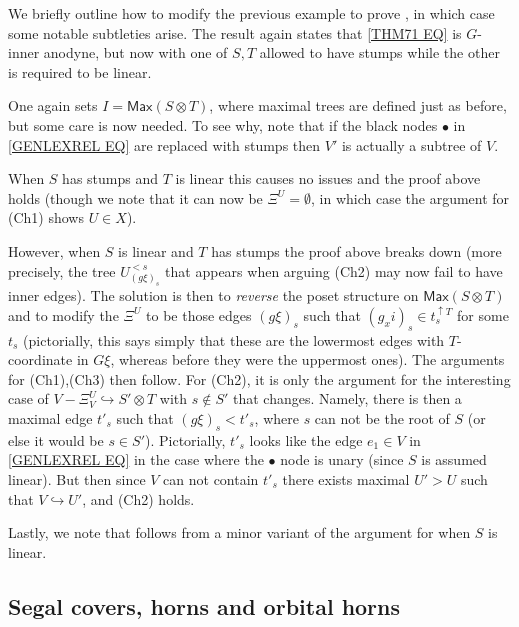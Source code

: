 \documentclass[a4paper,10pt,draft]{article}%
\begin{document}
 
\begin{remark}
We briefly outline how to modify the previous example to prove 
\cite[Thm 7.1(ii)]{Per17}, in which case some notable subtleties arise.
The result again states that \eqref{THM71 EQ} is $G$-inner anodyne, but now with one of $S,T$ allowed to have stumps while the other is required to be linear.

One again sets $I=\mathsf{Max}(S\otimes T)$, where maximal trees are defined just as before, but some care is now needed.
To see why, note that if the black nodes $\bullet$ in \eqref{GENLEXREL EQ} are replaced with stumps then $V'$
is actually a subtree of $V$.

When $S$ has stumps and $T$ is linear this causes no issues and the proof above holds
(though we note that it can now be 
$\Xi^U=\emptyset$, in which case the argument for (Ch1) shows $U\in X$).

However, when $S$ is linear and $T$ has stumps the proof above breaks down (more precisely, the tree $U_{(g\xi)_s}^{<s}$ that appears when arguing (Ch2) may now fail to have inner edges). The solution is then to \textit{reverse} the poset structure on 
$\mathsf{Max}(S\otimes T)$
and to modify the $\Xi^U$ to be those edges $(g \xi)_s$ such that
$(g _xi)_s \in t_s^{\uparrow T}$ for some $t_s$
(pictorially, this says simply that these are the lowermost edges with $T$-coordinate in $G\xi$, whereas before they were the uppermost ones). The arguments for (Ch1),(Ch3) then follow.
For (Ch2), it is only the argument for the interesting case of
$V- \Xi_V^U \hookrightarrow S' \otimes T$ with $s \not \in S'$
that changes. Namely, there is then a maximal edge $t'_s$ such that $(g \xi)_s < t'_s$, where $s$ can not be the root of $S$ (or else it would be $s \in S'$). Pictorially, $t'_s$ looks like the edge $e_1 \in V$ in \eqref{GENLEXREL EQ} in the case where the $\bullet$ node is unary (since $S$ is assumed linear). But then since $V$ can not contain $t'_s$ there exists maximal $U' > U$ such that $V \hookrightarrow U'$,
and (Ch2) holds.

Lastly, we note that \cite[Thm. 7.2]{Per17} follows from a minor variant of the argument for \cite[Thm. 7.1(ii)]{Per17} when $S$ is linear.
\end{remark}




\subsection{Segal covers, horns and orbital horns}
\end{document}
